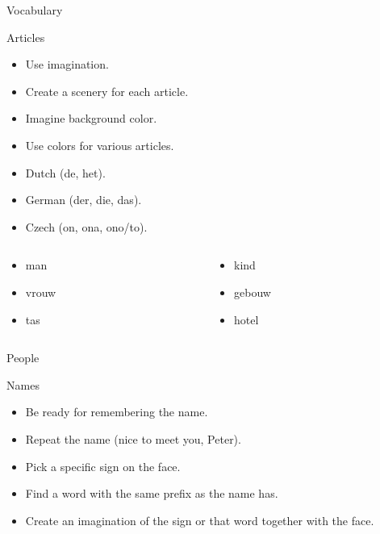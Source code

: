 \begin{frame}{Vocabulary}
  \begin{block}{Articles}
    \begin{itemize}
      \item Use imagination.
      \item Create a scenery for each article.
      \item Imagine background color.
      \item Use colors for various articles.
      \item Dutch ({\color{NavyBlue}de}, {\color{OliveGreen}het}).
      \item German ({\color{NavyBlue}der}, {\color{pink}die}, {\color{OliveGreen}das}). 
      \item Czech ({\color{NavyBlue}on}, {\color{pink}ona}, {\color{OliveGreen}ono/to}). 
    \end{itemize}
  \end{block}
  \begin{columns}[onlytextwidth]
    \begin{column}{0.5\textwidth}
      \begin{itemize}
        \item \color{NavyBlue} man
        \item vrouw
        \item tas
      \end{itemize}
    \end{column}
    \begin{column}{0.5\textwidth}
      \begin{itemize}
        \item \color{OliveGreen} kind
        \item gebouw
        \item hotel
      \end{itemize}
    \end{column}
  \end{columns}
\end{frame}

\begin{frame}{People}
  \begin{block}{Names}
    \begin{itemize}
      \item Be ready for remembering the name.
      \item Repeat the name (nice to meet you, Peter).
      \item Pick a specific sign on the face. 
      \item Find a word with the same prefix as the name has. 
      \item Create an imagination of the sign or that word together with the face. 
    \end{itemize}
  \end{block}
\end{frame}

